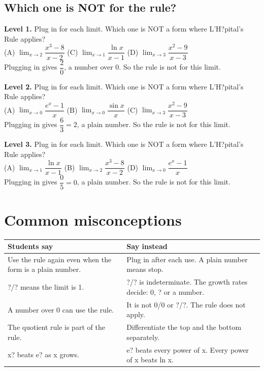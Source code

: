 \documentclass[11pt]{article}
\begin{document}
\subsection*{Which one is NOT for the rule?}
\noindent\textbf{Level 1.} Plug in for each limit. Which one is NOT a form where L'H?pital's Rule applies?\\ (A) $\displaystyle\lim_{x\to2}\dfrac{x^3-8}{x-2}$ \quad {} \quad (C) $\displaystyle\lim_{x\to1}\dfrac{\ln x}{x-1}$ \quad (D) $\displaystyle\lim_{x\to3}\dfrac{x^2-9}{x-3}$\\  \quad Plugging in gives $\dfrac20$, a number over 0. So the rule is not for this limit.\par\medskip
\noindent\textbf{Level 2.} Plug in for each limit. Which one is NOT a form where L'H?pital's Rule applies?\\ (A) $\displaystyle\lim_{x\to0}\dfrac{e^x-1}{x}$ \quad (B) $\displaystyle\lim_{x\to0}\dfrac{\sin x}{x}$ \quad (C) $\displaystyle\lim_{x\to3}\dfrac{x^2-9}{x-3}$ \quad {}\\  \quad Plugging in gives $\dfrac63=2$, a plain number. So the rule is not for this limit.\par\medskip
\noindent\textbf{Level 3.} Plug in for each limit. Which one is NOT a form where L'H?pital's Rule applies?\\ (A) $\displaystyle\lim_{x\to1}\dfrac{\ln x}{x-1}$ \quad (B) $\displaystyle\lim_{x\to2}\dfrac{x^3-8}{x-2}$ \quad {} \quad (D) $\displaystyle\lim_{x\to0}\dfrac{e^x-1}{x}$\\  \quad Plugging in gives $\dfrac05=0$, a plain number. So the rule is not for this limit.\par\medskip
\section*{Common misconceptions}\begin{tabularx}{\textwidth}{@{}X X@{}}\toprule Students say & Say instead\\\midrule
Use the rule again even when the form is a plain number. & Plug in after each use. A plain number means stop.\\
?/? means the limit is 1. & ?/? is indeterminate. The growth rates decide: 0, ? or a number.\\
A number over 0 can use the rule. & It is not 0/0 or ?/?. The rule does not apply.\\
The quotient rule is part of the rule. & Differentiate the top and the bottom separately.\\
x? beats e? as x grows. & e? beats every power of x. Every power of x beats ln x.\\
\bottomrule\end{tabularx}
\end{document}
